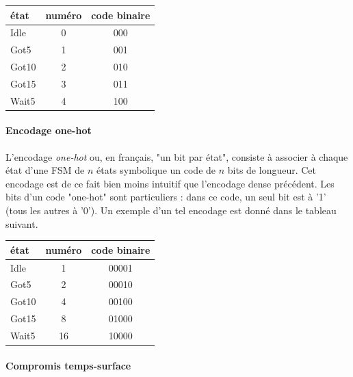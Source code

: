 \begin{table}[!htbp]
  \centering
  \begin{tabular}{|l|c|c|}
        \hline
        état  & numéro & code binaire  \\ \hline \hline
        Idle  & 0      & 000           \\ \hline
        Got5  & 1      & 001           \\ \hline
        Got10 & 2      & 010           \\ \hline
        Got15 & 3      & 011           \\ \hline
        Wait5 & 4      & 100           \\ \hline
    \end{tabular}
\end{table}

\paragraph{Encodage one-hot}
L'encodage {\it one-hot} ou, en français, "un bit par état", consiste à associer à chaque état d'une FSM de $n$ états
symbolique un code de $n$ bits de longueur. Cet encodage est de ce fait bien moins intuitif que l'encodage dense précédent.
Les bits d'un code "one-hot" sont particuliers : dans ce code, un seul bit est à '1' (tous les autres à '0'). Un exemple
d'un tel encodage est donné dans le tableau suivant.

\begin{table}[!htbp]
  \centering
  \begin{tabular}{|l|c|c|}
        \hline
        état  & numéro & code binaire  \\ \hline \hline
        Idle  & 1       & 00001           \\ \hline
        Got5  & 2       & 00010           \\ \hline
        Got10 & 4       & 00100           \\ \hline
        Got15 & 8       & 01000           \\ \hline
        Wait5 & 16      & 10000           \\ \hline
    \end{tabular}
\end{table}


\paragraph{Compromis temps-surface}

